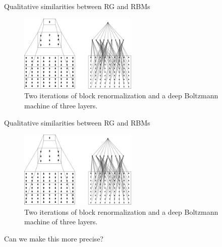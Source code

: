 \documentclass{beamer}
\begin{document}
\begin{frame}{Qualitative similarities between RG and RBMs}
  \begin{figure}[ht]
    \centering
    \includegraphics[width=0.5\textwidth]{figures/rg-rbm.png}
    \caption{Two iterations of block renormalization and a deep
      Boltzmann machine of three layers.\label{fig:rbm-rg} }
  \end{figure}
\end{frame}

\begin{frame}{Qualitative similarities between RG and RBMs}
  \begin{figure}[ht]
    \centering
    \includegraphics[width=0.5\textwidth]{figures/rg-rbm.png}
    \caption{Two iterations of block renormalization and a deep
      Boltzmann machine of three layers.\label{fig:rbm-rg} }
  \end{figure}
  {\Large Can we make this more precise?}
\end{frame}
\end{document}
